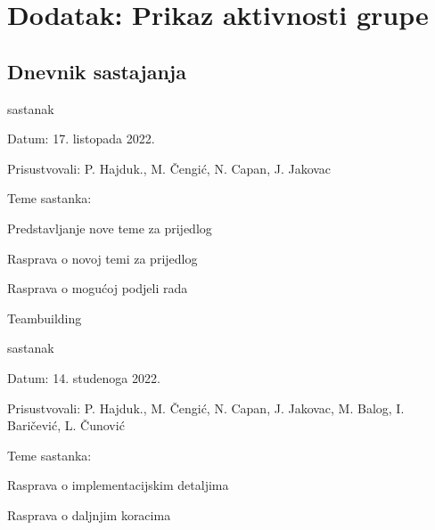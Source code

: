 \chapter*{Dodatak: Prikaz aktivnosti grupe}
		
		\section*{Dnevnik sastajanja}
		
		
		
		\begin{packed_enum}
			\item  sastanak
			
			\item[] \begin{packed_item}
				\item Datum: 17. listopada 2022.
				\item Prisustvovali: P. Hajduk., M. Čengić, N. Capan, J. Jakovac
				\item Teme sastanka:
				\begin{packed_item}
					\item  Predstavljanje nove teme za prijedlog
					\item  Rasprava o novoj temi za prijedlog
					\item  Rasprava o mogućoj podjeli rada
					\item  Teambuilding
				\end{packed_item}
			\end{packed_item}
			
			\item  sastanak
			\item[] \begin{packed_item}
				\item Datum: 14. studenoga 2022.
				\item Prisustvovali: P. Hajduk., M. Čengić, N. Capan, J. Jakovac, M. Balog, I. Baričević, L. Čunović
				\item Teme sastanka:
				\begin{packed_item}
					\item  Rasprava o implementacijskim detaljima
					\item  Rasprava o daljnjim koracima
				\end{packed_item}
			\end{packed_item}
			
			
		\end{packed_enum}
		
